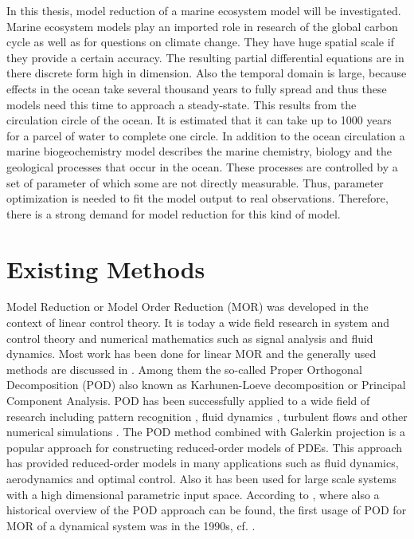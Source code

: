 In this thesis, model reduction of a marine ecosystem model will be investigated. Marine ecosystem models play an imported role 
in research of the global carbon cycle as well as for questions on climate change. They have huge spatial scale if they provide 
a certain accuracy. The resulting  partial differential equations are in there discrete form high in dimension. Also the temporal 
domain is large, because effects in the ocean take several thousand years to fully spread and thus these models need this time to approach
a steady-state. This results from 
the circulation circle of the ocean. It is estimated that it can take up to 1000 years for a parcel of water to complete one circle.
In addition to the ocean circulation a marine biogeochemistry model describes the marine chemistry, biology and the 
geological processes that occur in the ocean. These processes are controlled by a set of parameter of which some are not directly measurable.
Thus, parameter optimization is needed to fit the model output to real observations. Therefore, there is a strong demand
for model reduction for this kind of model. 


\section{Existing Methods}
Model Reduction or Model Order Reduction (MOR) was developed in the context of linear control theory. It is today
a wide field research in system and control theory and numerical mathematics such as signal analysis and
fluid dynamics. Most work has been done for linear MOR and the generally used methods are discussed in \cite{MOR2008}.
Among them the so-called Proper Orthogonal Decomposition (POD) also known as Karhunen-Loeve decomposition or Principal Component Analysis.
POD has been successfully applied to a wide field of research including pattern recognition \cite{PCAimagepattern,patternrec} , fluid dynamics \cite{A_anoptimizing,PODSWF}, turbulent flows \cite{Wang201210,Berkooz93theproper} and other numerical simulations \cite{Luo2016433,Buchan2015138}.
The POD method combined with Galerkin projection is a popular approach for constructing reduced-order models of PDEs. This approach has provided reduced-order models in many applications such as fluid dynamics, aerodynamics and optimal control.
Also it has been used for large scale systems with a high dimensional parametric input space. According to \cite{PODover},
where also a historical overview of the POD approach can be found, the first usage of POD for MOR of a 
dynamical system was in the 1990s, cf. \cite{PODfirst}.

